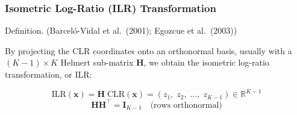 \begin{frame}[t]
  \frametitle{Isometric Log-Ratio (ILR) Transformation}
  \vspace{0.2cm}

 
      {Definition.} ({Barceló-Vidal et al.\ (2001); Egozcue et al.\ (2003)})

      By projecting the CLR coordinates onto an orthonormal basis, usually with a $(K{-}1)\!\times\! K$ Helmert sub-matrix $\mathbf{H}$, we obtain the isometric log-ratio transformation, or ILR:
 
      \vspace{0.2cm}
      \[
        \mathrm{ILR}(\mathbf{x})
        = \mathbf{H}\;\mathrm{CLR}(\mathbf{x})
        = (z_1,\;z_2,\;\ldots,\;z_{K-1})
        \in\mathbb{R}^{K-1}
      \]
      \[
        \mathbf{H}\mathbf{H}^\top = \mathbf{I}_{K-1}
        \quad\text{(rows orthonormal)}
      \]

\end{frame}




